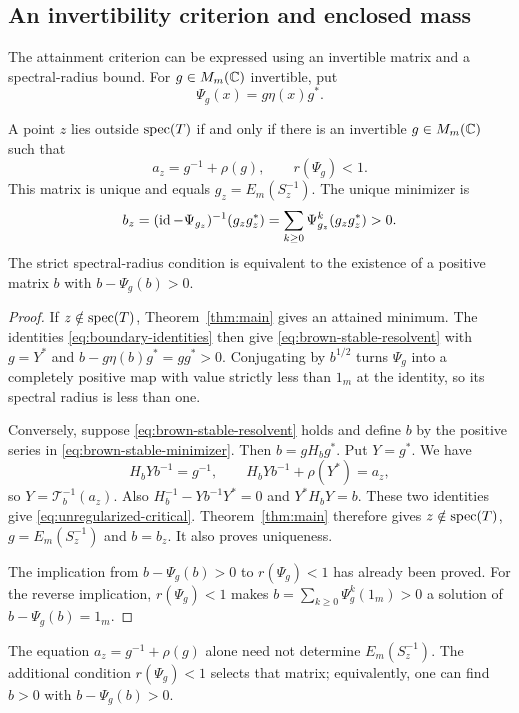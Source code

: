 \subsection{An invertibility criterion and enclosed mass}
The attainment criterion can be expressed using an invertible matrix and a spectral-radius bound.
For $g\in M_m(\mathbb C)$ invertible, put
\[
 \Psi_g(x)=g\eta(x)g^*.
\]
\begin{proposition}\label{prop:brown-stable-resolvent}
A point $z$ lies outside $\operatorname{spec}(T)$ if and only if there is an invertible $g\in M_m(\mathbb C)$ such that
\begin{equation}\label{eq:brown-stable-resolvent}
 a_z=g^{-1}+\rho(g),\qquad r(\Psi_g)<1.
\end{equation}
This matrix is unique and equals $g_z=E_m(S_z^{-1})$.
The unique minimizer is
\begin{equation}\label{eq:brown-stable-minimizer}
 b_z=(\operatorname{id}-\Psi_{g_z})^{-1}(g_zg_z^*)
     =\sum_{k\ge0}\Psi_{g_z}^k(g_zg_z^*)>0.
\end{equation}
The strict spectral-radius condition is equivalent to the existence of a positive matrix $b$ with $b-\Psi_g(b)>0$.
\end{proposition}
\begin{proof}
If $z\notin\operatorname{spec}(T)$, Theorem~\ref{thm:main} gives an attained minimum.
The identities \eqref{eq:boundary-identities} then give \eqref{eq:brown-stable-resolvent} with $g=Y^*$ and $b-g\eta(b)g^*=gg^*>0$.
Conjugating by $b^{1/2}$ turns $\Psi_g$ into a completely positive map with value strictly less than $1_m$ at the identity, so its spectral radius is less than one.

Conversely, suppose \eqref{eq:brown-stable-resolvent} holds and define $b$ by the positive series in \eqref{eq:brown-stable-minimizer}.
Then $b=gH_bg^*$.
Put $Y=g^*$.
We have
\[
 H_bYb^{-1}=g^{-1},\qquad
 H_bYb^{-1}+\rho(Y^*)=a_z,
\]
so $Y=\mathcal T_b^{-1}(a_z)$.
Also $H_b^{-1}-Yb^{-1}Y^*=0$ and $Y^*H_bY=b$.
These two identities give \eqref{eq:unregularized-critical}.
Theorem~\ref{thm:main} therefore gives $z\notin\operatorname{spec}(T)$, $g=E_m(S_z^{-1})$ and $b=b_z$.
It also proves uniqueness.

The implication from $b-\Psi_g(b)>0$ to $r(\Psi_g)<1$ has already been proved.
For the reverse implication, $r(\Psi_g)<1$ makes $b=\sum_{k\ge0}\Psi_g^k(1_m)>0$ a solution of $b-\Psi_g(b)=1_m$.
\end{proof}

The equation $a_z=g^{-1}+\rho(g)$ alone need not determine $E_m(S_z^{-1})$.
The additional condition $r(\Psi_g)<1$ selects that matrix; equivalently, one can find $b>0$ with $b-\Psi_g(b)>0$.

